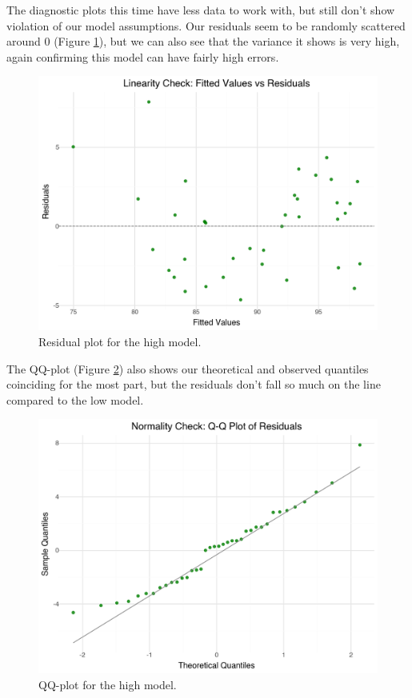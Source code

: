 \documentclass[twocolumn]{article} %
\begin{document}
The diagnostic plots this time have less data to work with, but still don't show violation of our model assumptions. Our residuals seem to be randomly scattered around 0 (Figure \ref{18:linearity-check}), but we can also see that the variance it shows is very high, again confirming this model can have fairly high errors.

\begin{figure}[h]
  \includegraphics[width=\columnwidth]{18-linearity-check.png}
  \caption{Residual plot for the high model.}
  \label{18:linearity-check}
\end{figure}

The QQ-plot (Figure \ref{19:qq-plot}) also shows our theoretical and observed quantiles coinciding for the most part, but the residuals don't fall so much on the line compared to the low model.

\begin{figure}[h]
  \includegraphics[width=\columnwidth]{19-qq-plot.png}
  \caption{QQ-plot for the high model.}
  \label{19:qq-plot}
\end{figure}
\end{document}

